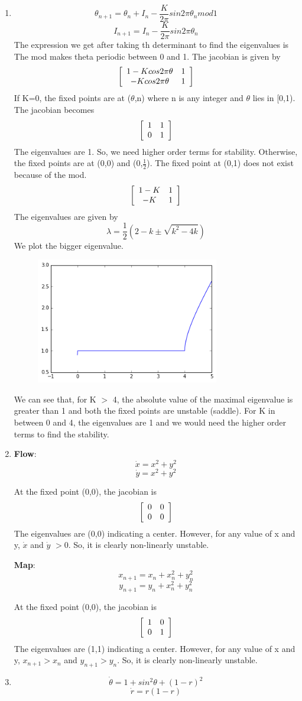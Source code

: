 \documentclass[a4paper]{article}
\newenvironment{mat}{\left[ \begin{array}{ccccccccccccc}}{\end{array}\right]}
\newcommand\bcm{\begin{mat}}
\newcommand\ecm{\end{mat}}
\begin{document}
\begin{enumerate}
\item
\[\theta_{n+1} = \theta_{n} + I_n - \frac{K}{2\pi}sin2\pi\theta_{n} mod 1\]
\[I_{n+1} =  I_n - \frac{K}{2\pi}sin2\pi\theta_{n} \]
 The expression we get after taking th determinant to find the eigenvalues is 
The mod makes theta periodic between 0 and 1.
The jacobian is given by
\[ \bcm 1 - Kcos 2\pi \theta & 1  \\ - Kcos 2\pi \theta & 1 \ecm \]
If K=0, the fixed points are at ($\theta$,n) where n is any integer and $\theta$ lies in [0,1).
The jacobian becomes 
\[ \bcm 1  & 1  \\ 0 & 1 \ecm \]
The eigenvalues are 1. So, we need higher order terms for stability. 
Otherwise, the fixed points are at (0,0) and (0,$\frac{1}{2}$). The fixed point at (0,1) does not exist because of the mod.
\[ \bcm 1 - K & 1  \\ - K & 1 \ecm \]
The eigenvalues are given by
\[ \lambda = \frac{1}{2}(2 - k \pm \sqrt{k^2-4k}) \]
We plot the bigger eigenvalue.
\begin{figure}[h!] 
	\centering
	\includegraphics[width=8cm]{map1}
\end{figure}


We can see that, for K $>$ 4, the absolute value of the maximal eigenvalue is greater than 1 and both the fixed points are unstable (saddle).
For K in between 0 and 4, the eigenvalues are 1 and we would need the higher order terms to find the stability.
\item
\textbf{Flow}:
\[\dot{x} = x^2 +y^2\]
\[\dot{y} = x^2 +y^2\]

At the fixed point (0,0), the jacobian is 
\[\bcm 0 &0 \\ 0& 0 \ecm\]
The eigenvalues are (0,0) indicating a center. However, for any value of x and y, $\dot{x}$ and $\dot{y}$ $>$0. So, it is clearly non-linearly unstable.

\textbf{Map}:
\[x_{n+1} =x_n+ x_n^2 +y_n^2\]
\[y_{n+1} =y_n+ x_n^2 +y_n^2\]

At the fixed point (0,0), the jacobian is 
\[\bcm 1 &0 \\ 0& 1 \ecm\]
The eigenvalues are (1,1) indicating a center. However, for any value of x and y, $x_{n+1} >x_n$ and $y_{n+1} >y_n$. So, it is clearly non-linearly unstable.
\item 
\[\dot{\theta}= 1 + sin^2 \theta + (1-r)^2 \]
\[ \dot{r} = r(1-r)\]


\end{enumerate}
\end{document}
